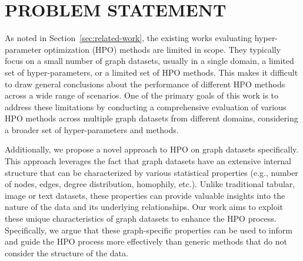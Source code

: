 \section{\uppercase{Problem Statement}}

As noted in Section~\ref{sec:related-work}, the existing works evaluating hyper-parameter optimization (HPO) methods are limited in scope. They typically focus on a small number of graph datasets, usually in a single domain, a limited set of hyper-parameters, or a limited set of HPO methods. This makes it difficult to draw general conclusions about the performance of different HPO methods across a wide range of scenarios. One of the primary goals of this work is to address these limitations by conducting a comprehensive evaluation of various HPO methods across multiple graph datasets from different domains, considering a broader set of hyper-parameters and methods.

Additionally, we propose a novel approach to HPO on graph datasets specifically. This approach leverages the fact that graph datasets have an extensive internal structure that can be characterized by various statistical properties (e.g., number of nodes, edges, degree distribution, homophily, etc.). Unlike traditional tabular, image or text datasets, these properties can provide valuable insights into the nature of the data and its underlying relationships. Our work aims to exploit these unique characteristics of graph datasets to enhance the HPO process. Specifically, we argue that these graph-specific properties can be used to inform and guide the HPO process more effectively than generic methods that do not consider the structure of the data.
